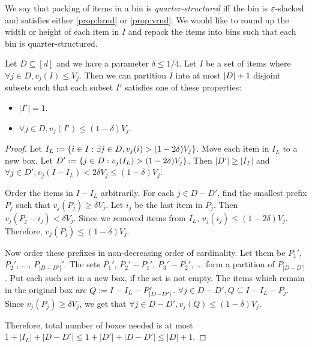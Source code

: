 We say that packing of items in a bin is \emph{quarter-structured} iff
the bin is $\varepsilon$-slacked and satisfies either \cref{prop:hrnd} or \cref{prop:vrnd}.
We would like to round up the width or height of each item in $I$ and repack the items
into bins such that each bin is quarter-structured.

\begin{lemma}
\label{lem:split-slack}
Let $D \subseteq [d]$ and we have a parameter $\delta \le 1/4$.
Let $I$ be a set of items where $\forall j \in D, v_j(I) \le V_j$.
Then we can partition $I$ into at most $\left\lvert D \right\rvert+1$ disjoint subsets
such that each subset $I'$ satisfies one of these properties:
\begin{itemize}
\item $|I'| = 1$.
\item $\forall j \in D, v_j(I') \le (1-\delta)V_j$.
\end{itemize}
\end{lemma}
\begin{proof}
Let $I_L := \{i \in I: \exists j \in D, v_j(i) > (1-2\delta)V_j\}$.
Move each item in $I_L$ to a new box.
Let $D' := \{ j \in D: v_j(I_L) > (1-2\delta)V_j\}$.
Then $|D'| \ge |I_L|$ and $\forall j \in D', v_j(I-I_L) < 2\delta V_j \le (1-\delta)V_j$.

Order the items in $I-I_L$ arbitrarily.
For each $j \in D-D'$, find the smallest prefix $P_j$ such that $v_j(P_j) \ge \delta V_j$.
Let $i_j$ be the last item in $P_j$. Then $v_j(P_j - i_j) < \delta V_j$.
Since we removed items from $I_L$, $v_j(i_j) \le (1-2\delta)V_j$.
Therefore, $v_j(P_j) \le (1-\delta)V_j$.

Now order these prefixes in non-decreasing order of cardinality.
Let them be $P_1'$, $P_2'$, $\ldots$, $P_{|D-D'|}'$.
The sets $P_1'$, $P_2'-P_1'$, $P_3'-P_2'$, $\ldots$ form a partition of $P_{|D-D'|}$.
Put each such set in a new box, if the set is not empty.
The items which remain in the original box are $Q := I-I_L-P_{|D-D'|}'$.
$\forall j \in D-D', Q \subseteq I-I_L-P_j$.
Since $v_j(P_j) \ge \delta V_j$, we get that $\forall j \in D-D', v_j(Q) \le (1-\delta)V_j$.

Therefore, total number of boxes needed is at most
$1 + |I_L| + |D-D'| \le 1 + |D'| + |D-D'| \le |D| + 1$.
\end{proof}

